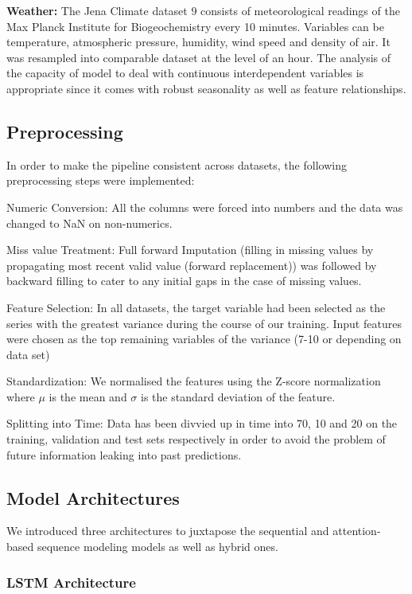 \documentclass[conference]{IEEEtran}
\begin{document}
\textbf{Weather:} The Jena Climate \cite{jena} dataset 9 consists of meteorological readings of the Max Planck Institute for Biogeochemistry every 10 minutes. Variables can be temperature, atmospheric pressure, humidity, wind speed and density of air. It was resampled into comparable dataset at the level of an hour. The analysis of the capacity of model to deal with continuous interdependent variables is appropriate since it comes with robust seasonality as well as feature relationships.

\subsection{Preprocessing}
In order to make the pipeline consistent across datasets, the following preprocessing steps were implemented:

Numeric Conversion: All the columns were forced into numbers and the data was changed to NaN on non-numerics.

Miss value Treatment: Full forward Imputation (filling in missing values by propagating most recent valid value (forward replacement)) was followed by backward filling to cater to any initial gaps in the case of missing values.

Feature Selection: In all datasets, the target variable had been selected as the series with the greatest variance during the course of our training. Input features were chosen as the top remaining variables of the variance (7-10 or depending on data set)

Standardization: We normalised the features using the Z-score normalization
where $\mu$ is the mean and $\sigma$ is the standard deviation of the feature.

Splitting into Time: Data has been divvied up in time into 70, 10 and 20 on the training, validation and test sets respectively in order to avoid the problem of future information leaking into past predictions.

\subsection{Model Architectures}
We introduced three architectures to juxtapose the sequential and attention-based sequence modeling models as well as hybrid ones.
\subsubsection{LSTM Architecture}
\end{document}
